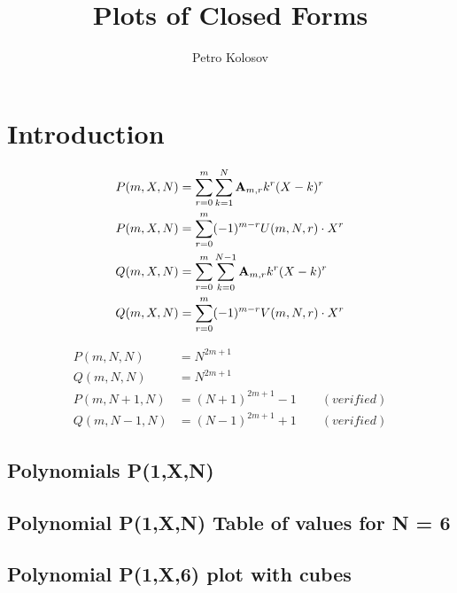\documentclass[12pt,letterpaper,oneside,reqno]{amsart}
\title[Plots of Closed Forms]
{Plots of Closed Forms}
\author[Petro Kolosov]{Petro Kolosov}
\newcommand \coeffA [3][A] {{\mathbf{#1}} \sb{#2,#3}}
\newcommand \polynomialP [4][P]{{#1}(#2,#3,#4)}
\newcommand \polynomialQ [4][Q]{{#1}(#2,#3,#4)}
\begin{document}
%        

    \maketitle

    \tableofcontents


    \section{Introduction}\label{sec:introduction}
    \begin{align*}
        \polynomialP{m}{X}{N} &= \sum_{r=0}^{m} \sum_{k=1}^{N} \coeffA{m}{r} k^r (X-k)^r \\
        \polynomialP{m}{X}{N} &= \sum_{r=0}^{m} (-1)^{m-r} U(m, N, r) \cdot X^{r} \\
        \polynomialQ{m}{X}{N} &= \sum_{r=0}^{m} \sum_{k=0}^{N-1} \coeffA{m}{r} k^r (X-k)^r \\
        \polynomialQ{m}{X}{N} &= \sum_{r=0}^{m} (-1)^{m-r} V(m, N, r) \cdot X^{r}
    \end{align*}

    \begin{align*}
        \polynomialP{m}{N}{N} &= N^{2m+1} \\
        \polynomialQ{m}{N}{N} &= N^{2m+1} \\
        \polynomialP{m}{N+1}{N} &= (N+1)^{2m+1} - 1 \quad \quad (verified) \\
        \polynomialQ{m}{N-1}{N} &= (N-1)^{2m+1} + 1 \quad \quad (verified)
    \end{align*}

    \subsection{Polynomials P(1,X,N)}
    

    \subsection{Polynomial P(1,X,N) Table of values for N = 6}
    

    \subsection{Polynomial P(1,X,6) plot with cubes}
    
\end{document}
